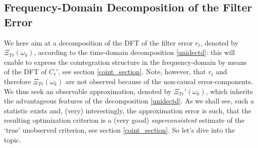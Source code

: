 \documentclass[11pt]{article}
\begin{document}
\subsection{Frequency-Domain Decomposition of the Filter Error}\label{dft_non-stat}



We here aim at a decomposition of the DFT  of the filter error $r_t$, denoted by $\Xi_{Tr}(\omega_k)$, according to the time-domain decomposition \ref{unidectd}: this will enable to express the  cointegration structure in the frequency-domain by means of the DFT of $C_t'$, see section \ref{coint_section}. Note, however, that $r_t$ and therefore $\Xi_{Tr}(\omega_k)$ are not observed because of the non-causal error-components. We thus seek an observable approximation, denoted by $\Xi_{Tr}'(\omega_k)$, which inherits the advantageous features of the decomposition \ref{unidectd}. As we shall see, such a statistic exists and, (very) interestingly, the approximation error is such, that the resulting optimization criterion is a (very good)  \emph{superconsistent} estimate of the `true' unobserved criterion, see section \ref{coint_section}. So let's dive into the topic.\\
\end{document}
